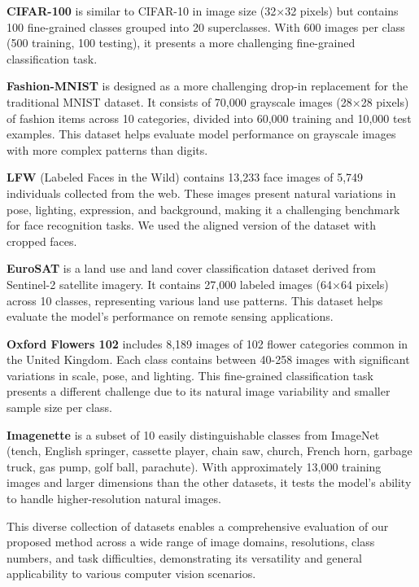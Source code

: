 \noindent \textbf{CIFAR-100} \cite{krizhevsky2009learning} is similar to CIFAR-10 in image size (32×32 pixels) but contains 100 fine-grained classes grouped into 20 superclasses. With 600 images per class (500 training, 100 testing), it presents a more challenging fine-grained classification task.

\noindent \textbf{Fashion-MNIST} \cite{xiao2017fashionmnist} is designed as a more challenging drop-in replacement for the traditional MNIST dataset. It consists of 70,000 grayscale images (28×28 pixels) of fashion items across 10 categories, divided into 60,000 training and 10,000 test examples. This dataset helps evaluate model performance on grayscale images with more complex patterns than digits.

\noindent \textbf{LFW} \cite{LFWTech} (Labeled Faces in the Wild) contains 13,233 face images of 5,749 individuals collected from the web. These images present natural variations in pose, lighting, expression, and background, making it a challenging benchmark for face recognition tasks. We used the aligned version of the dataset with cropped faces.

\noindent \textbf{EuroSAT} \cite{helber2019eurosat} is a land use and land cover classification dataset derived from Sentinel-2 satellite imagery. It contains 27,000 labeled images (64×64 pixels) across 10 classes, representing various land use patterns. This dataset helps evaluate the model's performance on remote sensing applications.

\noindent \textbf{Oxford Flowers 102} \cite{nilsback2008automated} includes 8,189 images of 102 flower categories common in the United Kingdom. Each class contains between 40-258 images with significant variations in scale, pose, and lighting. This fine-grained classification task presents a different challenge due to its natural image variability and smaller sample size per class.

\noindent \textbf{Imagenette} \cite{imagenette2019} is a subset of 10 easily distinguishable classes from ImageNet (tench, English springer, cassette player, chain saw, church, French horn, garbage truck, gas pump, golf ball, parachute). With approximately 13,000 training images and larger dimensions than the other datasets, it tests the model's ability to handle higher-resolution natural images.

This diverse collection of datasets enables a comprehensive evaluation of our proposed method across a wide range of image domains, resolutions, class numbers, and task difficulties, demonstrating its versatility and general applicability to various computer vision scenarios.


